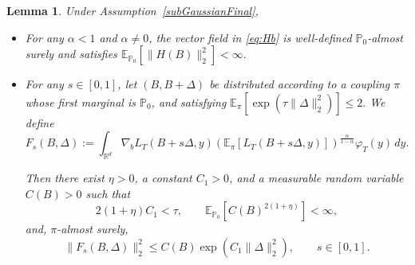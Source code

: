 \documentclass[11pt]{article}
\newtheorem{lemma}{Lemma}
\theoremstyle{definition}
\newcommand{\E}{\mathbb{E}}
\begin{document}
\begin{lemma}\label{lem:L22-fro}
Under Assumption~\ref{subGaussianFinal},
\begin{itemize}
    \item[(1)]
    For any $\alpha<1$ and $\alpha\neq0$, the vector field in
    \eqref{eq:Hb} is well-defined $\mathbb P_0$-almost surely and
    satisfies $\E_{\mathbb P_0}
    \left[
    \|H(B)\|_2^2
    \right]
    <\infty.$

    \item[(2)]
    For any $s\in[0,1]$, let $(B,B+\Delta)$ be distributed according
    to a coupling $\pi$ whose first marginal is $\mathbb P_0$, and satisfying $\E_\pi
\left[
\exp\!\left(\tau\|\Delta\|_2^2\right)
\right]
\leq 2.$ We define
    \[
    F_s(B,\Delta)
    :=
    \int_{\mathbb R^d}
    \nabla_bL_T(B+s\Delta,y)
    \left(
    \E_{\pi}[L_T(B+s\Delta,y)]
    \right)^{\frac{\alpha}{1-\alpha}}
    \varphi_T(y)\,dy.
    \]

    Then there exist $\eta>0$, a constant $C_1>0$, and a measurable
    random variable $C(B)>0$ such that
    \[
    2(1+\eta)C_1<\tau,
    \qquad
    \E_{\mathbb P_0}
    \left[
    C(B)^{2(1+\eta)}
    \right]
    <\infty,
    \]
    and, $\pi$-almost surely,
    \[
    \|F_s(B,\Delta)\|_2^2
    \leq
    C(B)
    \exp\!\left(C_1\|\Delta\|_2^2\right),
    \qquad s\in[0,1].
    \]
\end{itemize}
\end{lemma}
\end{document}
